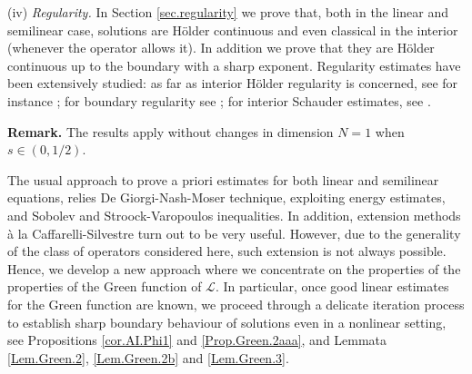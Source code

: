 \documentclass[11pt]{article}
\numberwithin{equation}{section}
\newcommand{\A}{\mathcal{L}}
\begin{document}
\noindent (iv)\textit{ Regularity. }In Section \ref{sec.regularity} we prove that, both in the linear and semilinear case, solutions are H\"older continuous and even classical in the interior (whenever the operator allows it).
In addition we prove that they are H\"older continuous up to the boundary with a sharp exponent. Regularity estimates have been extensively studied: as far as interior H\"older regularity is concerned, see for instance \cite{CDDS, Ka, BCI, CS2, CS3, Si, Tan}; for boundary regularity see \cite{CS2016, Grub1, RosSer, RosSer1, RosSer2, SV1}; for interior  Schauder estimates, see  \cite{BaFiVa, DK}.

\noindent\textbf{Remark. } The results apply without changes in dimension  $N=1$ when $s \in (0,1/2)$.


The usual approach to prove a priori estimates for both linear and semilinear equations, relies De Giorgi-Nash-Moser technique, exploiting energy estimates, and Sobolev and Stroock-Varopoulos inequalities. In addition, extension methods \`a la Caffarelli-Silvestre \cite{Caffarelli-Silvestre} turn out to be very useful. However, due to the generality of the class of operators considered here, such extension is not always possible. Hence, we develop a new approach where we concentrate on the properties of the properties of the Green function of $\A$. In particular, once good linear estimates for the Green function are known, we proceed through a delicate iteration process to establish sharp boundary behaviour of solutions even in a nonlinear setting,   see Propositions \ref{cor.AI.Phi1} and \ref{Prop.Green.2aaa}, and Lemmata \ref{Lem.Green.2}, \ref{Lem.Green.2b}  and \ref{Lem.Green.3}.
\end{document}

